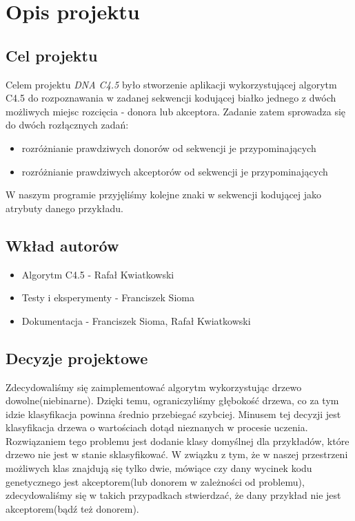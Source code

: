 \section{Opis projektu}
\subsection{Cel projektu}


Celem projektu {\it DNA C4.5} było stworzenie aplikacji wykorzystującej algorytm C4.5 do rozpoznawania w zadanej sekwencji kodującej białko jednego z dwóch możliwych miejsc rozcięcia - donora lub akceptora. Zadanie zatem sprowadza się do dwóch rozłącznych zadań: 
\begin{itemize}
    \item rozróżnianie prawdziwych donorów od sekwencji je przypominających
    \item rozróżnianie prawdziwych akceptorów od sekwencji je przypominających
\end{itemize}

W naszym programie przyjęliśmy kolejne znaki w sekwencji kodującej jako atrybuty danego przykładu.
\subsection{Wkład autorów}
\begin{itemize}
    \item Algorytm C4.5 - Rafał Kwiatkowski
    \item Testy i eksperymenty - Franciszek Sioma
    \item Dokumentacja - Franciszek Sioma, Rafał Kwiatkowski
\end{itemize}
\subsection{Decyzje projektowe}


Zdecydowaliśmy się zaimplementować algorytm wykorzystując drzewo dowolne(niebinarne). Dzięki temu, ograniczyliśmy głębokość drzewa, co za tym idzie klasyfikacja powinna średnio przebiegać szybciej.
Minusem tej decyzji jest klasyfikacja drzewa o wartościach dotąd nieznanych w procesie uczenia. Rozwiązaniem tego problemu jest dodanie klasy domyślnej dla przykładów, które drzewo nie jest w stanie sklasyfikować. W związku z tym, że w naszej przestrzeni możliwych klas znajdują się tylko dwie, mówiące czy dany wycinek kodu genetycznego jest akceptorem(lub donorem w zależności od problemu), zdecydowaliśmy się w takich przypadkach stwierdzać, że dany przykład nie jest akceptorem(bądź też donorem). 

